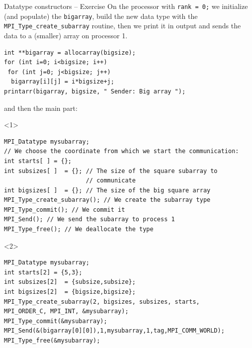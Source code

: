 \documentclass[xcolor={svgnames,usenames}]{beamer}
\begin{document}
\begin{frame}[fragile]{Datatype constructors -- Exercise}
\small\vspace{-1em}
On the processor with \texttt{rank = 0;} we initialize (and populate) the \texttt{bigarray}, build the new data type with the \texttt{MPI_Type_create_subarray} routine, then we print it in output and sends the data to a (smaller) array on processor 1.
\begin{verbatim}
int **bigarray = allocarray(bigsize);
for (int i=0; i<bigsize; i++)
 for (int j=0; j<bigsize; j++)
  bigarray[i][j] = i*bigsize+j;
printarr(bigarray, bigsize, " Sender: Big array ");
\end{verbatim}
and then the main part:
\begin{onlyenv}<1>
\begin{verbatim}
MPI_Datatype mysubarray;
// We choose the coordinate from which we start the communication:
int starts[ ] = {};
int subsizes[ ]  = {}; // The size of the square subarray to 
                       // communicate
int bigsizes[ ]  = {}; // The size of the big square array
MPI_Type_create_subarray(); // We create the subarray type
MPI_Type_commit(); // We commit it
MPI_Send(); // We send the subarray to process 1
MPI_Type_free(); // We deallocate the type
\end{verbatim}
\end{onlyenv}
\begin{onlyenv}<2>
\begin{verbatim}
MPI_Datatype mysubarray;
int starts[2] = {5,3};
int subsizes[2]  = {subsize,subsize};
int bigsizes[2]  = {bigsize,bigsize};
MPI_Type_create_subarray(2, bigsizes, subsizes, starts,
MPI_ORDER_C, MPI_INT, &mysubarray);
MPI_Type_commit(&mysubarray);
MPI_Send(&(bigarray[0][0]),1,mysubarray,1,tag,MPI_COMM_WORLD);
MPI_Type_free(&mysubarray);
\end{verbatim}
\end{onlyenv}
\end{frame}
\end{document}
